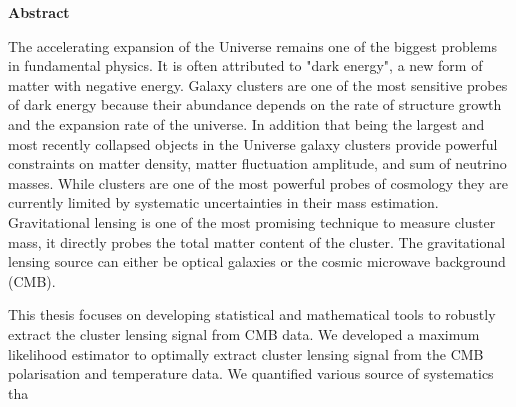 \bfseries{Abstract}\mdseries\\                                                                                                
\vspace{1.0cm}                                                                                                                                  
                                                                                                                                                
The accelerating expansion of the Universe remains one of the biggest problems in fundamental physics. 
 It is often attributed to "dark energy", a new form of matter with negative energy. 
Galaxy clusters are one of the most sensitive probes of dark energy because their abundance depends on the rate of structure growth and the expansion rate of the universe. 
In addition that being the largest and most recently collapsed objects in the Universe galaxy clusters provide powerful constraints on matter density, matter fluctuation amplitude, and sum of neutrino masses.
 While clusters are one of the most powerful probes of cosmology they are currently limited by systematic uncertainties in their mass estimation.
 Gravitational lensing is one of the most promising technique to measure cluster mass, it directly probes the total matter content of the cluster. 
 The gravitational lensing source can either be optical galaxies or the cosmic microwave background (CMB). 
 
 
 This thesis focuses on developing statistical and mathematical tools to robustly extract the cluster lensing signal from CMB data. 
 We developed a maximum likelihood estimator to optimally extract cluster lensing signal from the CMB polarisation and temperature data. 
 We quantified various source of systematics tha
 
  
                                                                                                                                   
\vspace{4.0cm}                                                                                                                                  
                                                                                                                                                
                                                                                                                                                

